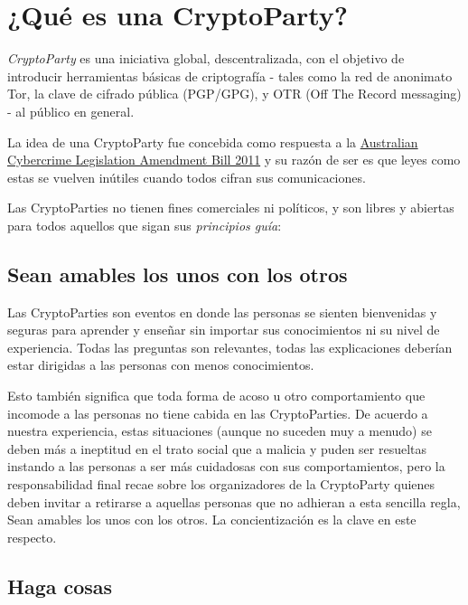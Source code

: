 \documentclass[10pt,a5paper,twoside,,]{book}
\begin{document}
\section{¿Qué es una CryptoParty?}\label{quuxe9-es-una-cryptoparty}

\emph{CryptoParty} es una iniciativa global, descentralizada, con el
objetivo de introducir herramientas básicas de criptografía - tales como
la red de anonimato Tor, la clave de cifrado pública (PGP/GPG), y OTR
(Off The Record messaging) - al público en general.

La idea de una CryptoParty fue concebida como respuesta a la
\href{http://theconversation.edu.au/cybercrime-bill-makes-it-through-but-what-does-that-mean-for-you-8953}{Australian
Cybercrime Legislation Amendment Bill 2011} y su razón de ser es que
leyes como estas se vuelven inútiles cuando todos cifran sus
comunicaciones.

Las CryptoParties no tienen fines comerciales ni políticos, y son libres
y abiertas para todos aquellos que sigan sus \emph{principios guía}:

\subsection{Sean amables los unos con los
otros}\label{sean-amables-los-unos-con-los-otros}

Las CryptoParties son eventos en donde las personas se sienten
bienvenidas y seguras para aprender y enseñar sin importar sus
conocimientos ni su nivel de experiencia. Todas las preguntas son
relevantes, todas las explicaciones deberían estar dirigidas a las
personas con menos conocimientos.

Esto también significa que toda forma de acoso u otro comportamiento que
incomode a las personas no tiene cabida en las CryptoParties. De acuerdo
a nuestra experiencia, estas situaciones (aunque no suceden muy a
menudo) se deben más a ineptitud en el trato social que a malicia y
puden ser resueltas instando a las personas a ser más cuidadosas con sus
comportamientos, pero la responsabilidad final recae sobre los
organizadores de la CryptoParty quienes deben invitar a retirarse a
aquellas personas que no adhieran a esta sencilla regla, Sean amables
los unos con los otros. La concientización es la clave en este respecto.

\subsection{Haga cosas}\label{haga-cosas}
\end{document}
